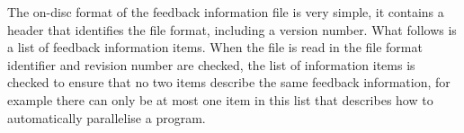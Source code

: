 The on-disc format of the feedback information file is very simple, it
contains a header that identifies the file format, including a version number.
What follows is a list of feedback information items.
When the file is read in the file format identifier and revision
number are checked,
the list of information items is checked to ensure that no two items
describe the same feedback information, for example there can only be at
most one item in this list that describes how to automatically
parallelise a program.

